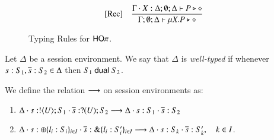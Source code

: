 \begin{figure}[t]
\[\begin{array}{lc}
	 	\trule{Rec}& \tree{
			\Gamma \cat \rvar{X}: \Delta; \emptyset; \Delta  \proves P \hastype \Proc
		}{
			\Gamma ; \emptyset; \Delta  \proves \recp{X}{P} \hastype \Proc
		}


%
%
%
	\end{array}
\]
\caption{Typing Rules for $\mathsf{HO}\pi$.\label{fig:typerulesmy}}
\end{figure}






\begin{definition}\label{d:wtenv}%
	Let $\Delta$ be a session environment.
	We say that $\Delta$ is {\em well-typed} if whenever
	$s: S_1, \overline{s}: S_2 \in \Delta$ then $S_1 \ \mathsf{dual}\  S_2$.
\end{definition}

\begin{definition}%
\label{def:ses_red}
	We define the relation $\longrightarrow$ on session environments as:
	\begin{enumerate}[$-$]
		\item	$\Delta \cdot s: ! \langle U \rangle ; S_1 \cdot \overline{s}: ? (U) ; S_2 \longrightarrow \Delta \cdot s: S_1 \cdot \overline{s}: S_2$
		\item	$\Delta \cdot s: \oplus \{l_i: S_i\}_{i \in I} \cdot \overline{s}: \& \{l_i: S_i'\}_{i \in I} \longrightarrow \Delta \cdot s: S_k \cdot \overline{s}: S_k', \quad k \in I$.
	\end{enumerate}
\end{definition}

